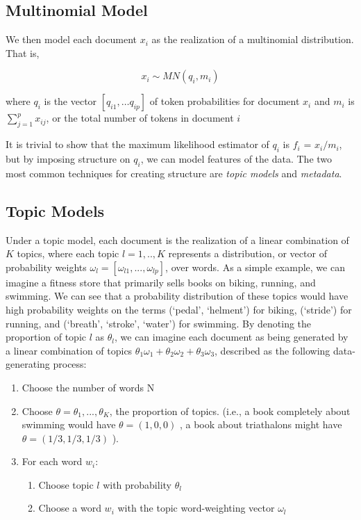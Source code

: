 \documentclass[12pt]{article}
\begin{document}
\subsection{Multinomial Model}\label{multinomial-model}

We then model each document $x_i$ as the realization of a multinomial
distribution. That is,

\[ x_{i} \sim MN(q_i,m_i) \]

where $q_i$ is the vector $[q_{i1}, \dots q_{ip}]$ of token
probabilities for document $x_i$ and $m_i$ is
$\sum_{j = 1}^{p}{x_{ij}}$, or the total number of tokens in document
$i$

It is trivial to show that the maximum likelihood estimator of $q_i$ is
$f_i$ = $x_i / m_i$, but by imposing structure on $q_i$, we can model
features of the data. The two most common techniques for creating
structure are \emph{topic models} and \emph{metadata}.

\subsection{Topic Models}\label{topic-models}

Under a topic model, each document is the realization of a
linear combination of $K$ topics, where each topic $l = 1,..,K$ represents a
distribution, or vector of probability weights
$\omega_l = [\omega_{l1}, ... , \omega_{lp}]$, over words. As a simple
example, we can imagine a fitness store that primarily sells books on
biking, running, and swimming. We can see that a probability
distribution of these topics would have high probability weights on the
terms (`pedal', `helment') for biking, (`stride') for running, and
(`breath', `stroke', `water') for swimming. By denoting the
proportion of topic $l$ as $\theta_l$, we can imagine each document as
being generated by a linear combination of topics
$\theta_1 \omega_1  + \theta_2 \omega_2 + \theta_3 \omega_3 $, described
as the following data-generating process:


\begin{enumerate}
\item 
Choose the number of words N 
\item
  Choose $\theta = \theta_1,...,\theta_K$, the proportion of topics.
  (i.e., a book completely about swimming would have $\theta=(1,0,0)$ ,
  a book about triathalons might have $\theta =(1/3,1/3,1/3)$ ).
\item
  For each word $w_i$:
\begin{enumerate}
\item Choose topic $l$ with probability $\theta_l$
\item
Choose  a word $w_{i}$ with the topic word-weighting vector $\omega_l$
\end{enumerate}
\end{enumerate}
\end{document}
